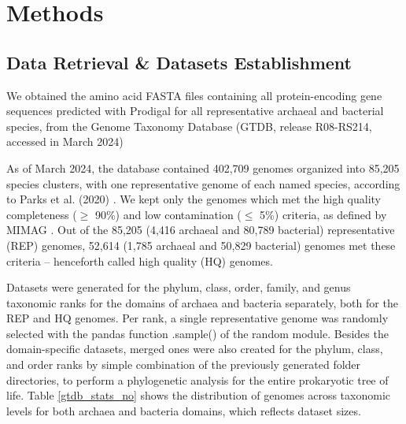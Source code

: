 \section{Methods}


\subsection*{Data Retrieval \& Datasets Establishment}
We obtained the amino acid FASTA files containing all protein-encoding gene sequences predicted with Prodigal \cite{hyatt2010a} for all representative archaeal and bacterial species, from the Genome Taxonomy Database (GTDB, release R08-RS214, accessed in March 2024) \cite{parks2018, parks2020, parks2022, rinke2021} 

As of March 2024, the database contained 402,709 genomes organized into 85,205 species clusters, with one representative genome of each named species, according to Parks et al. (2020) \cite{parks2020}. We kept only the genomes which met the high quality completeness ($\geq$  90\%) and low contamination ($\leq$ 5\%) criteria, as defined by MIMAG \cite{thegenomestandardsconsortium2017}. Out of the 85,205 (4,416 archaeal and 80,789 bacterial) representative (REP) genomes, 52,614 (1,785 archaeal and 50,829 bacterial) genomes met these criteria -- henceforth called high quality (HQ) genomes. 
 
Datasets were generated for the phylum, class, order, family, and genus taxonomic ranks for the domains of archaea and bacteria separately, both for the REP and HQ genomes. Per rank, a single representative genome was randomly selected with the pandas function .sample() of the random module. Besides the domain-specific datasets, merged ones were also created for the phylum, class, and order ranks by simple combination of the previously generated folder directories, to perform a phylogenetic analysis for the entire prokaryotic tree of life. Table \ref*{gtdb_stats_no} shows the distribution of genomes across taxonomic levels for both archaea and bacteria domains, which reflects dataset sizes.


